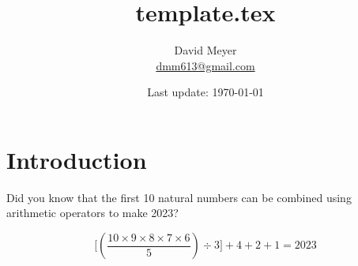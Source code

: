 \documentclass{article}
\title{template.tex}
\author{David Meyer \\ \href{mailto:dmm613@gmail.com}
                            {dmm613@gmail.com}}
\date{Last update: \today}
\theoremstyle{definition}
\begin{document}
\maketitle
%
%
%
\section{Introduction}
\label{sec:introduction}
Did you know that the first 10 natural numbers can be combined 
using arithmetic operators to make 2023? 


\bigskip
{\large
\begin{center}
\begin{equation*}
\Bigg [ \left (\dfrac{10 \times 9 \times 8 \times 7 \times 6}{5} \right ) \div 3 \Bigg ] + 4 + 2 + 1 = 2023
\end{equation*}
\end{center}}

\bigskip
%
%
%
%
%
%
%
%
%
%
%	
%
%
%
%
\end{document}
